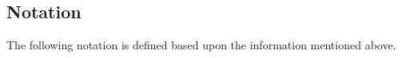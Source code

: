 \documentclass[10pt,journal,compsoc]{IEEEtran}
\begin{document}




\subsection{Notation}

The following notation is defined based upon the information mentioned above.
\end{document}
